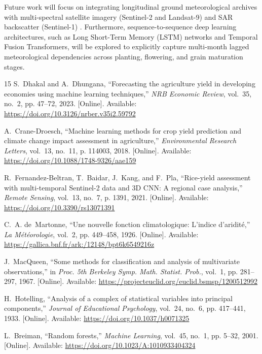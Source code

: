 \documentclass[conference]{IEEEtran}
\begin{document}
Future work will focus on integrating longitudinal ground meteorological archives with multi-spectral satellite imagery (Sentinel-2 and Landsat-9) and SAR backscatter (Sentinel-1) \cite{fernandez2021}. Furthermore, sequence-to-sequence deep learning architectures, such as Long Short-Term Memory (LSTM) networks and Temporal Fusion Transformers, will be explored to explicitly capture multi-month lagged meteorological dependencies across planting, flowering, and grain maturation stages.

\begin{thebibliography}{15}
S.~Dhakal and A.~Dhungana, ``Forecasting the agriculture yield in developing economies using machine learning techniques,'' \emph{NRB Economic Review}, vol.~35, no.~2, pp. 47--72, 2023. [Online]. Available: \url{https://doi.org/10.3126/nrber.v35i2.59792}

A.~Crane-Droesch, ``Machine learning methods for crop yield prediction and climate change impact assessment in agriculture,'' \emph{Environmental Research Letters}, vol.~13, no.~11, p. 114003, 2018. [Online]. Available: \url{https://doi.org/10.1088/1748-9326/aae159}

R.~Fernandez-Beltran, T.~Baidar, J.~Kang, and F.~Pla, ``Rice-yield assessment with multi-temporal Sentinel-2 data and 3D CNN: A regional case analysis,'' \emph{Remote Sensing}, vol.~13, no.~7, p. 1391, 2021. [Online]. Available: \url{https://doi.org/10.3390/rs13071391}

C.~A. de~Martonne, ``Une nouvelle fonction climatologique: L'indice d'aridit{\'e},'' \emph{La M{\'e}t{\'e}orologie}, vol.~2, pp. 449--458, 1926. [Online]. Available: \url{https://gallica.bnf.fr/ark:/12148/bpt6k6549216z}

J.~MacQueen, ``Some methods for classification and analysis of multivariate observations,'' in \emph{Proc. 5th Berkeley Symp. Math. Statist. Prob.}, vol.~1, pp. 281--297, 1967. [Online]. Available: \url{https://projecteuclid.org/euclid.bsmsp/1200512992}

H.~Hotelling, ``Analysis of a complex of statistical variables into principal components,'' \emph{Journal of Educational Psychology}, vol.~24, no.~6, pp. 417--441, 1933. [Online]. Available: \url{https://doi.org/10.1037/h0071325}

L.~Breiman, ``Random forests,'' \emph{Machine Learning}, vol.~45, no.~1, pp. 5--32, 2001. [Online]. Available: \url{https://doi.org/10.1023/A:1010933404324}


\end{thebibliography}
\end{document}
